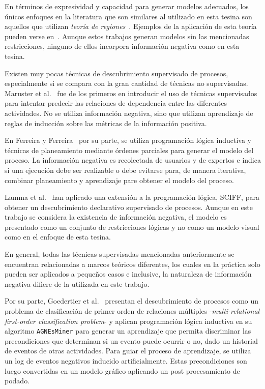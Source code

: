 En términos de expresividad y capacidad para generar modelos adecuados, los únicos enfoques en la literatura 
que son similares al utilizado en esta tesina son aquellos que utilizan \textit{teoría de regiones}~\cite{ehrenfeucht90, ehrenfeucht90a}.
Ejemplos de la aplicación de esta teoría pueden verse en~\cite{Bergenthum07, van2008process, CarmonaCK10, SoleC11}.
Aunque estos trabajos generan modelos sin las mencionadas restricciones, ninguno de ellos incorpora
información negativa como en esta tesina.

Existen muy pocas técnicas de descubrimiento supervisado de procesos, especialmente si se compara
con la gran cantidad de técnicas no supervisadas. Maruster et al.~\cite{Maruster2006} fue de los 
primeros en introducir el uso de técnicas supervisados para intentar predecir las relaciones
de dependencia entre las diferentes actividades. No se utiliza información negativa, sino que
utilizan aprendizaje de reglas de inducción sobre las métricas de la información positiva.

En Ferreira y Ferreira~\cite{Ferreira2006} por su parte, se utiliza programación lógica inductiva
y técnicas de planeamiento mediante órdenes parciales para generar el modelo del proceso.
La información negativa es recolectada de usuarios y de expertos e indica si una
ejecución debe ser realizable o debe evitarse para, de manera iterativa, combinar
planeamiento y aprendizaje pare obtener el modelo del proceso.

Lamma et al.~\cite{Lamma2007,Lamma2008,alberti2008verifiable} han aplicado una extensión a la 
programación lógica, SCIFF, para obtener un descubrimiento declarativo supervisado de procesos.
Aunque en este trabajo se considera la existencia de información negativa, el modelo es presentado 
como un conjunto de restricciones lógicas y no como un modelo visual como en el enfoque de esta tesina. 

En general, todas las técnicas supervisadas mencionadas anteriormente se encuentran relacionadas a 
marcos teóricos diferentes, los cuales en la práctica solo pueden ser aplicados a pequeños casos e 
inclusive, la naturaleza de información negativa difiere de la utilizada en este trabajo.

Por su parte, Goedertier et al.~\cite{Goedertier2009} 
presentan el descubrimiento de procesos como un problema de clasificación de primer orden de relaciones
múltiples -\textit{multi-relational first-order classification problem}- y aplican programación lógica
inductiva en su algoritmo \texttt{AGNEsMiner} para generar un aprendizaje que permita discriminar
las precondiciones que determinan si un evento puede ocurrir o no, dado un historial de eventos
de otras actividades.  Para guiar el proceso de aprendizaje, se utiliza un log de eventos negativos 
inducido artificialmente. Estas precondiciones son luego convertidas en un modelo gráfico aplicando 
un post procesamiento de podado.

